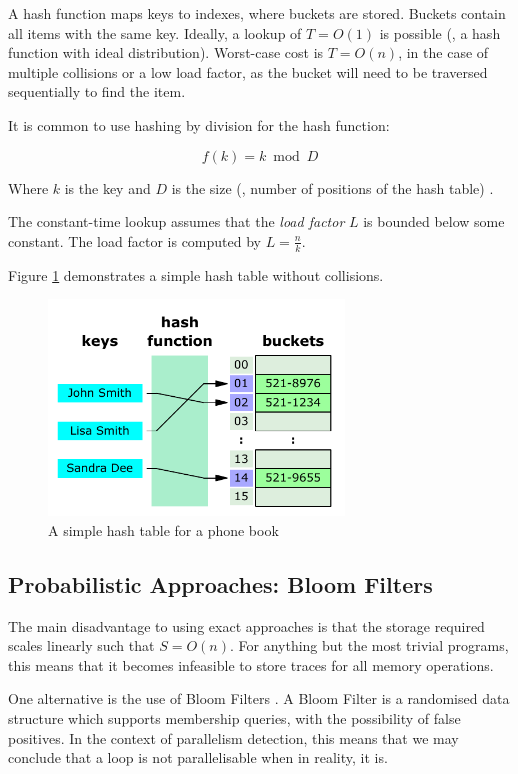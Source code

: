 	A hash function maps keys to indexes, where buckets are stored. Buckets contain all items with the same key. Ideally, a lookup of $T=O(1)$ is possible (\ie, a hash function with ideal distribution). Worst-case cost is $T=O(n)$, in the case of multiple collisions or a low load factor, as the bucket will need to be traversed sequentially to find the item.
		
	It is common to use hashing by division for the hash function:
		
	\[
		f(k) = k \bmod{D}
	\]
		
	Where $k$ is the key and $D$ is the size (\ie, number of positions of the hash table) \citep{DSandAlgsCpp}.
		
	The constant-time lookup assumes that the \textit{load factor} $L$ is bounded below some constant. The load factor is computed by $L=\frac{n}{k}$.
		
	Figure \ref{fig:hash-table} demonstrates a simple hash table without collisions.
		
	\begin{figure}
		\centering
		\includegraphics[width=0.7\textwidth]{graphics/hash-table.pdf}
		\caption{A simple hash table for a phone book \citep{HashTableWikiDiagram}}
		\label{fig:hash-table}
	\end{figure}

	\subsection{Probabilistic Approaches: Bloom Filters} \label{sec:runtime/storage/probabilistic}
	The main disadvantage to using exact approaches is that the storage required scales linearly such that $S=O(n)$. For anything but the most trivial programs, this means that it becomes infeasible to store traces for all memory operations.
	
	One alternative is the use of Bloom Filters \citep{Bloom1970}. A Bloom Filter is a randomised data structure which supports membership queries, with the possibility of false positives. In the context of parallelism detection, this means that we may conclude that a loop is not parallelisable when in reality, it is.
		
